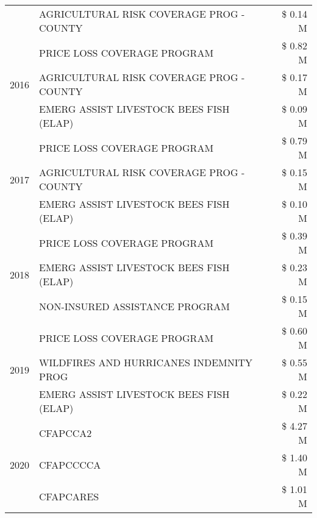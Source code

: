 \begin{tabular}{llr}
 & AGRICULTURAL RISK COVERAGE PROG - COUNTY & \$ 0.14 M \\
\cline{1-3}
\multirow[t]{3}{*}{2016} & PRICE LOSS COVERAGE PROGRAM                   & \$ 0.82 M \\
 & AGRICULTURAL RISK COVERAGE PROG - COUNTY      & \$ 0.17 M \\
 & EMERG ASSIST LIVESTOCK BEES FISH (ELAP)       & \$ 0.09 M \\
\cline{1-3}
\multirow[t]{3}{*}{2017} & PRICE LOSS COVERAGE PROGRAM & \$ 0.79 M \\
 & AGRICULTURAL RISK COVERAGE PROG - COUNTY & \$ 0.15 M \\
 & EMERG ASSIST LIVESTOCK BEES FISH (ELAP) & \$ 0.10 M \\
\cline{1-3}
\multirow[t]{3}{*}{2018} & PRICE LOSS COVERAGE PROGRAM & \$ 0.39 M \\
 & EMERG ASSIST LIVESTOCK BEES FISH (ELAP) & \$ 0.23 M \\
 & NON-INSURED ASSISTANCE PROGRAM & \$ 0.15 M \\
\cline{1-3}
\multirow[t]{3}{*}{2019} & PRICE LOSS COVERAGE PROGRAM & \$ 0.60 M \\
 & WILDFIRES AND HURRICANES INDEMNITY PROG & \$ 0.55 M \\
 & EMERG ASSIST LIVESTOCK BEES FISH (ELAP) & \$ 0.22 M \\
\cline{1-3}
\multirow[t]{3}{*}{2020} & CFAPCCA2 & \$ 4.27 M \\
 & CFAPCCCCA & \$ 1.40 M \\
 & CFAPCARES & \$ 1.01 M \\
\cline{1-3}
\bottomrule
\end{tabular}
